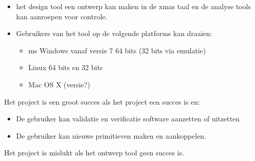 \begin{itemize}
 \item het design tool een ontwerp kan maken in de xmas taal en de analyse tools kan aanroepen voor controle.
 \item Gebruikers van het tool op de volgende platforms kan draaien:
 \begin{itemize}
    \item ms Windows vanaf versie 7 64 bits (32 bits via emulatie)
    \item Linux 64 bits en 32 bits
    \item Mac OS X (versie?)
 \end{itemize}
\end{itemize}

Het project is een groot succes als het project een succes is en:

\begin{itemize}
 \item De gebruiker kan validatie en verificatie software aanzetten of uitzetten
 \item De gebruiker kan nieuwe primitieven maken en aankoppelen.
\end{itemize}

Het project is mislukt als het ontwerp tool geen succes is.
